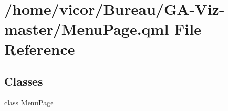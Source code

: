 \hypertarget{_menu_page_8qml}{}\section{/home/vicor/\+Bureau/\+G\+A-\/\+Viz-\/master/\+Menu\+Page.qml File Reference}
\label{_menu_page_8qml}
\subsection*{Classes}
\begin{DoxyCompactItemize}
\item 
class \hyperlink{class_menu_page}{Menu\+Page}
\end{DoxyCompactItemize}
